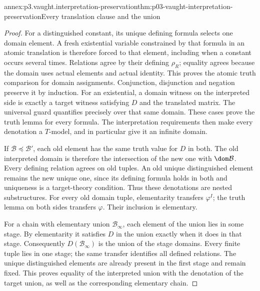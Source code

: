 \begin{annexitem}{annex:p3.vaught.interpretation-preservation}{thm:p03-vaught-interpretation-preservation}{Every translation clause and the union}
\begin{proof}
For a distinguished constant, its unique defining formula selects
one domain element. A fresh existential variable constrained by
that formula in an atomic translation is therefore forced to
that element, including when a constant occurs several times.
Relations agree by their defining \(\rho_R\); equality agrees
because the domain uses actual elements and actual identity.
This proves the atomic truth comparison for domain assignments.
Conjunction, disjunction and negation preserve it by induction.
For an existential, a domain witness on the interpreted side
is exactly a target witness satisfying \(D\) and the translated
matrix. The universal guard quantifies precisely over that same
domain. These cases prove the truth lemma for every formula.
The interpretation requirements then make every denotation a
\(T\)-model, and in particular give it an infinite domain.

If \(\mathcal B\preccurlyeq\mathcal B'\), each old element has
the same truth value for \(D\) in both. The old interpreted domain
is therefore the intersection of the new one with \(\dom\mathcal B\).
Every defining relation agrees on old tuples.
An old unique distinguished element remains the new unique one,
since its defining formula holds in both and uniqueness is a
target-theory condition. Thus these denotations are nested
substructures. For every old domain tuple, elementarity transfers
\(\varphi^I\); the truth lemma on both sides transfers \(\varphi\).
Their inclusion is elementary.

For a chain with elementary union \(\mathcal B_\infty\), each element
of the union lies in some stage. By elementarity it satisfies \(D\)
in the union exactly when it does in that stage.
Consequently \(D(\mathcal B_\infty)\) is the union of the stage
domains. Every finite tuple lies in one stage; the same transfer
identifies all defined relations. The unique distinguished
elements are already present in the first stage and remain fixed.
This proves equality of the interpreted union with the denotation
of the target union, as well as the corresponding elementary chain.
\end{proof}
\end{annexitem}

